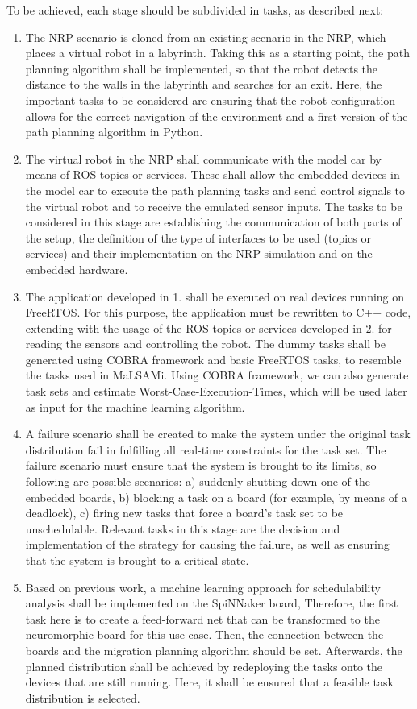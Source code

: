 To be achieved, each stage should be subdivided in tasks, as described next:
\begin{enumerate}
\item	The NRP scenario is cloned from an existing scenario in the NRP, which places a virtual robot in a labyrinth. Taking this as a starting point, the path planning algorithm shall be implemented, so that the robot detects the distance to the walls in the labyrinth and searches for an exit. Here, the important tasks to be considered are ensuring that the robot configuration allows for the correct navigation of the environment and a first version of the path planning algorithm in Python.
\item	The virtual robot in the NRP shall communicate with the model car by means of ROS topics or services. These shall allow the embedded devices in the model car to execute the path planning tasks and send control signals to the virtual robot and to receive the emulated sensor inputs. The tasks to be considered in this stage are establishing the communication of both parts of the setup, the definition of the type of interfaces to be used (topics or services) and their implementation on the NRP simulation and on the embedded hardware.
\item	The application developed in 1. shall be executed on real devices running on FreeRTOS. For this purpose, the application must be rewritten to C++ code, extending with the usage of the ROS topics or services developed in 2. for reading the sensors and controlling the robot. The dummy tasks shall be generated using COBRA framework and basic FreeRTOS tasks, to resemble the tasks used in MaLSAMi. Using COBRA framework, we can also generate task sets and estimate Worst-Case-Execution-Times, which will be used later as input for the machine learning algorithm.
\item	A failure scenario shall be created to make the system under the original task distribution fail in fulfilling all real-time constraints for the task set. The failure scenario must ensure that the system is brought to its limits, so following are possible scenarios: a) suddenly shutting down one of the embedded boards, b) blocking a task on a board (for example, by means of a deadlock), c) firing new tasks that force a board’s task set to be unschedulable. Relevant tasks in this stage are the decision and implementation of the strategy for causing the failure, as well as ensuring that the system is brought to a critical state.
\item	Based on previous work, a machine learning approach for schedulability analysis shall be implemented on the SpiNNaker board, Therefore, the first task here is to create a feed-forward net that can be transformed to the neuromorphic board for this use case. Then, the connection between the boards and the migration planning algorithm should be set. Afterwards, the planned distribution shall be achieved by redeploying the tasks onto the devices that are still running. Here, it shall be ensured that a feasible task distribution is selected.

\end{enumerate}
